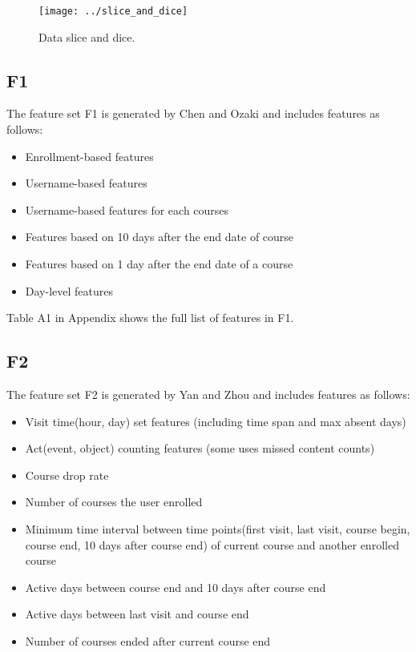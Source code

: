 \begin{figure}[!t]
	\centering
	\texttt{[image: ../slice\_and\_dice]}
	\label{fig:slice}
	\caption{Data slice and dice.}
\end{figure}

\subsection{F1}

The feature set F1 is generated by Chen and Ozaki and includes features as follows:

\begin{itemize}
  \setlength\itemsep{0em}
  \item Enrollment-based features 
  \item Username-based features 
  \item Username-based features for each courses 
  \item Features based on 10 days after the end date of course 
  \item Features based on 1 day after the end date of a course 
  \item Day-level features 
\end{itemize}

Table A1 in Appendix shows the full list of features in F1.

\subsection{F2}
The feature set F2 is generated by Yan and Zhou and includes features as follows:
\begin{itemize}
  \setlength\itemsep{0em}
  \item Visit time(hour, day) set features (including time span and max absent days)
  \item Act(event, object) counting features (some uses missed content counts)
  \item Course drop rate
  \item Number of courses the user enrolled
  \item Minimum time interval between time points(first visit, last visit, course begin, course end, 10 days after course end) of current course and another enrolled course
  \item Active days between course end and 10 days after course end
  \item Active days between last visit and course end
  \item Number of courses ended after current course end
\end{itemize}


